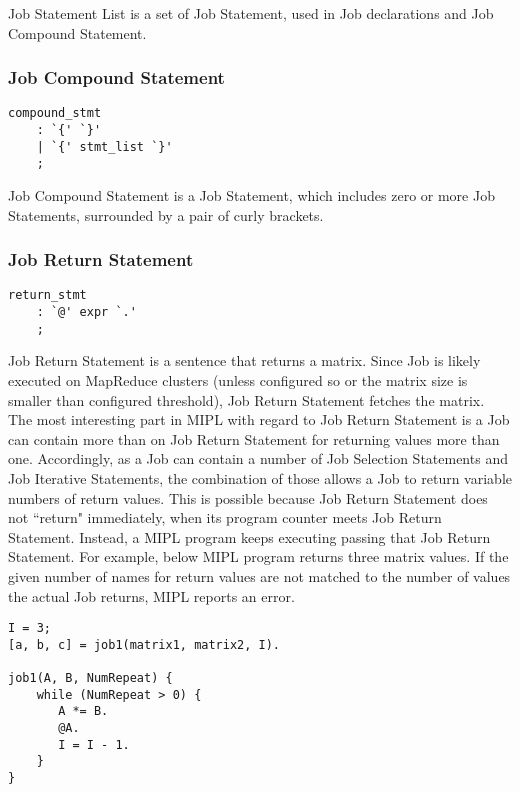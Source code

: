 \documentclass[prodmode,acmtecs]{acmsmall}
\begin{document}
Job Statement List is a set of Job Statement, used in Job
declarations and Job Compound Statement.
\medskip


\subsubsection{Job Compound Statement}

\begin{lstlisting}
compound_stmt
	: `{' `}'
	| `{' stmt_list `}'
	;
\end{lstlisting}

Job Compound Statement is a Job Statement, which includes
zero or more Job Statements, surrounded by a pair of curly
brackets.
\medskip

\subsubsection{Job Return Statement}

\begin{lstlisting}
return_stmt
	: `@' expr `.'
	;

\end{lstlisting}

Job Return Statement is a sentence that returns a matrix.  Since
Job is likely executed on MapReduce clusters (unless configured
so or the matrix size is smaller than configured threshold), Job
Return Statement fetches the matrix.  The most interesting part
in MIPL with regard to Job Return Statement is a Job can contain
more than on Job Return Statement for returning values more than
one.  Accordingly, as a Job can contain a number of Job Selection
Statements and Job Iterative Statements, the combination of those
allows a Job to return variable numbers of return values. This is
possible because Job Return Statement does not ``return" immediately,
when its program counter meets Job Return Statement.  Instead, a
MIPL program keeps executing passing that Job Return Statement.
For example, below MIPL program returns three matrix values.  If
the given number of names for return values are not matched to the
number of values the actual Job returns, MIPL reports an error.

\begin{lstlisting}
I = 3;
[a, b, c] = job1(matrix1, matrix2, I).

job1(A, B, NumRepeat) {
    while (NumRepeat > 0) {
       A *= B.
       @A.
       I = I - 1. 
    }
}
\end{lstlisting}
\end{document}
